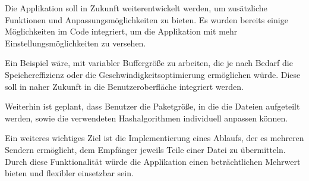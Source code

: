 Die Applikation soll in Zukunft weiterentwickelt werden, um zusätzliche Funktionen und Anpassungsmöglichkeiten zu bieten.
Es wurden bereits einige Möglichkeiten im Code integriert, um die Applikation mit mehr Einstellungsmöglichkeiten zu versehen.

Ein Beispiel wäre, mit variabler Buffergröße zu arbeiten, die je nach Bedarf die Speichereffizienz oder die Geschwindigkeitsoptimierung ermöglichen würde.
Diese soll in naher Zukunft in die Benutzeroberfläche integriert werden.

Weiterhin ist geplant, dass Benutzer die Paketgröße, in die die Dateien aufgeteilt werden, sowie die verwendeten Hashalgorithmen individuell anpassen können.

Ein weiteres wichtiges Ziel ist die Implementierung eines Ablaufs, der es mehreren Sendern ermöglicht, dem Empfänger jeweils Teile einer Datei zu übermitteln.
Durch diese Funktionalität würde die Applikation einen beträchtlichen Mehrwert bieten und flexibler einsetzbar sein.
